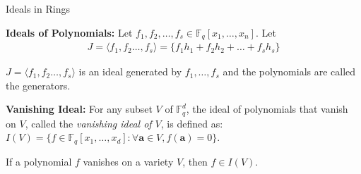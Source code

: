 \documentclass[xcolor=dvipsnames]{beamer}
\newcommand{\Fq}{{\mathbb{F}}_{q}}
\begin{document}
\begin{frame}{\large {Ideals in Rings}}
\vspace{-0.2in}



\begin{Definition}
{\bf Ideals of Polynomials:} Let $f_1, f_2, \ldots, f_s \in
\mathbb{F}_q[x_1, \dots, x_n]$. Let 
\begin{eqnarray}
J = \langle f_1, f_2 \ldots, f_s\rangle = \{f_1 h_1 + f_2 h_2 + \dots + f_s h_s\} \nonumber 
\end{eqnarray}

$J = \langle f_1, f_2 \ldots, f_s\rangle$ is an ideal generated by
$f_1, \ldots, f_s$ and the polynomials are called the generators. 
\end{Definition}


\begin{Definition}
{\bf Vanishing Ideal:} For any subset $V$ of $\Fq^d$, the ideal of polynomials that
vanish on $V$, called the {\it vanishing ideal of $V$}, is defined as: 
$I(V) = \{f\in \Fq[x_1,\dots, x_d]: \forall
\mathbf{a} \in V, f(\mathbf{a}) = 0\}.$


\end{Definition}

If a polynomial $f$ vanishes on a variety $V$, then $f \in I(V)$. 
\end{frame}

\end{document}
